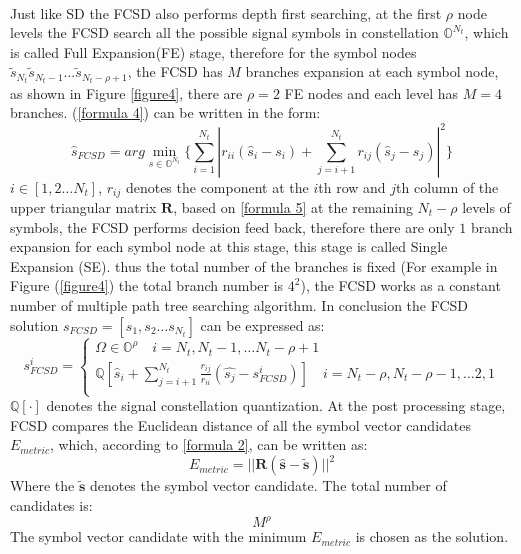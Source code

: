 \documentclass[12pt,a4paper,final]{article}
\begin{document}
\begin{spacing}{2.5}
\paragraph{}Just like SD the FCSD also performs depth first searching, at the first $\rho$ node levels the FCSD search all the possible signal symbols in constellation $\mathbb{O}^{N_{t}}$, which is called Full Expansion(FE) stage, therefore for the symbol nodes $\widetilde{s}_{N_{t}} \widetilde{s}_{N_{t}-1}\dots \widetilde{s}_{N_{t}-\rho+1}$, the FCSD has $M$ branches expansion at each symbol node,  as shown in Figure \ref{figure4}, there are $\rho=2$ FE nodes and each level has $M=4$ branches. (\ref{formula 4}) can be written in the form: 
\begin{equation}
\hat{s}_{FCSD}=arg\min_{s\in \mathbb{O}^{N_{t}}}\{\sum_{i=1}^{N_{t}}|r_{ii}(\hat{s}_{i}-s_{i})+\sum_{j=i+1}^{N_{t}}r_{ij}(\hat{s}_{j}-s_{j})|^{2}\}  \label{formula 5}
\end{equation} 
$i\in [1,2\dots N_{t}]$, $r_{ij}$ denotes the component at the $i$th row and $j$th column of the upper triangular matrix $\mathbf{R}$,  based on \ref{formula 5} at the remaining $N_{t}-\rho$ levels of symbols, the FCSD performs decision feed back, therefore there are only $1$ branch expansion for each symbol node at this stage, this stage is called Single Expansion (SE). 
thus the total number of the branches is fixed (For example in Figure (\ref{figure4}) the total branch number is $4^{2}$), the FCSD works as a constant number of multiple path tree searching algorithm.
In conclusion the FCSD solution $s_{FCSD}=[s_{1},s_{2}\dots s_{N_{t}}]$ can be expressed as:
\begin{displaymath}
s_{FCSD}^{i}=\left\lbrace\begin{array}{c}
\Omega\in  \mathbb{O}^{\rho}      \quad i=N_{t},N_{t}-1,\dots N_{t}-\rho+1\\
\mathbb{Q}[\hat{s}_{i}+\sum_{j=i+1}^{N_{t}}\frac{r_{ij}}{r_{ii}}(\hat{s_{j}}-s_{FCSD}^{i})] \quad i=N_{t}-\rho,N_{t}-\rho-1,\dots 2,1 \\
\end{array}\right.
\end{displaymath}
$\mathbb{Q}[\cdot]$ denotes the signal constellation quantization. At the post processing stage, FCSD compares the Euclidean distance of all the symbol vector candidates $E_{metric}$, which, according to \ref{formula 2}, can be written as:
\begin{equation}
E_{metric}=||\mathbf{R}(\mathbf{\hat{s}}-\mathbf{\widetilde{s}})||^{2}
\end{equation} 
Where the $\mathbf{\widetilde{s}}$ denotes the symbol vector candidate. The total number of candidates is: 
\begin{equation}
M^{\rho}     \label{path number}
\end{equation} 
The symbol vector candidate with the minimum $E_{metric}$ is chosen as the solution.

\end{spacing}
\end{document}
